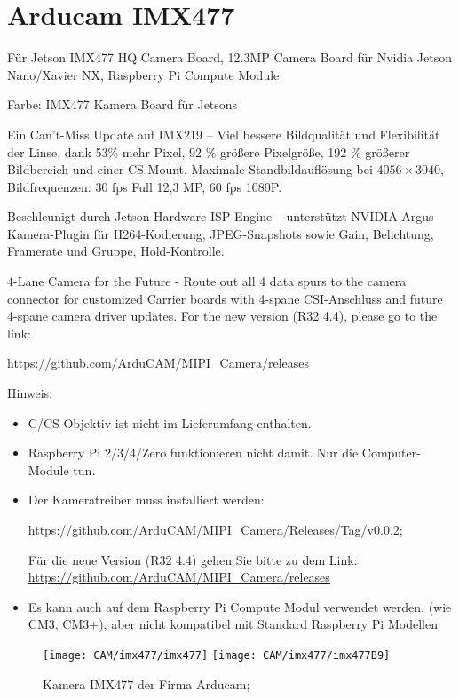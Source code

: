 %
%
%

\chapter{Arducam IMX477}

Für Jetson IMX477 HQ Camera Board, 12.3MP Camera Board für Nvidia Jetson Nano/Xavier NX, Raspberry Pi Compute Module


Farbe: IMX477 Kamera Board für Jetsons

Ein Can't-Miss Update auf IMX219 – Viel bessere Bildqualität und Flexibilität der Linse, dank 53\% mehr Pixel, 92 \% größere Pixelgröße, 192 \% größerer Bildbereich und einer CS-Mount. Maximale Standbildauflösung bei $4056 \times 3040$, Bildfrequenzen: 30 fps \@ Full 12,3 MP, 60 fps \@ 1080P.

Beschleunigt durch Jetson Hardware ISP Engine – unterstützt NVIDIA Argus Kamera-Plugin für H264-Kodierung, JPEG-Snapshots sowie Gain, Belichtung, Framerate und Gruppe, Hold-Kontrolle.

4-Lane Camera for the Future - Route out all 4 data spurs to the camera connector for customized Carrier boards with 4-spane CSI-Anschluss and future 4-spane camera driver updates. For the new version (R32 4.4), please go to the link:

\url{https://github.com/ArduCAM/MIPI_Camera/releases} 

Hinweis:

\begin{itemize}
  \item C/CS-Objektiv ist nicht im Lieferumfang enthalten. 
  \item Raspberry Pi 2/3/4/Zero funktionieren nicht damit. Nur die Computer-Module tun. 
  \item Der Kameratreiber muss installiert werden:
  
       \url{https://github.com/ArduCAM/MIPI_Camera/Releases/Tag/v0.0.2}; 
       
       Für die neue Version (R32 4.4) gehen Sie bitte zu dem Link: \url{https://github.com/ArduCAM/MIPI_Camera/releases}
  \item  Es kann auch auf dem Raspberry Pi Compute Modul verwendet werden. (wie CM3, CM3+), aber nicht kompatibel mit Standard Raspberry Pi Modellen
\end{itemize}


\begin{figure}
    \begin{center}
        \texttt{[image: CAM/imx477/imx477]}
        \quad 
        \texttt{[image: CAM/imx477/imx477B9]}
        
        \caption{Kamera IMX477 der Firma Arducam; \cite{Arducam:2021}}
    \end{center}    
\end{figure}


